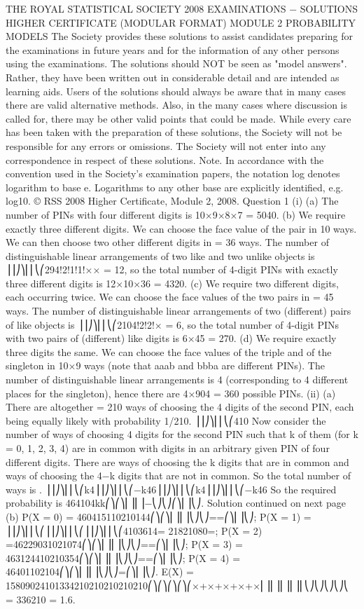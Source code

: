 THE ROYAL STATISTICAL SOCIETY
2008 EXAMINATIONS − SOLUTIONS
HIGHER CERTIFICATE
(MODULAR FORMAT)
MODULE 2
PROBABILITY MODELS
The Society provides these solutions to assist candidates preparing for the examinations in future years and for the information of any other persons using the examinations.
The solutions should NOT be seen as "model answers". Rather, they have been written out in considerable detail and are intended as learning aids.
Users of the solutions should always be aware that in many cases there are valid alternative methods. Also, in the many cases where discussion is called for, there may be other valid points that could be made.
While every care has been taken with the preparation of these solutions, the Society will not be responsible for any errors or omissions.
The Society will not enter into any correspondence in respect of these solutions.
Note. In accordance with the convention used in the Society's examination papers, the notation log denotes logarithm to base e. Logarithms to any other base are explicitly identified, e.g. log10.
© RSS 2008
Higher Certificate, Module 2, 2008. Question 1
(i) (a) The number of PINs with four different digits is 10×9×8×7 = 5040.
(b) We require exactly three different digits. We can choose the face value of the pair in 10 ways. We can then choose two other different digits in = 36 ways. The number of distinguishable linear arrangements of two like and two unlike objects is ⎟⎟⎠⎞⎜⎜⎝⎛294!2!1!1!×× = 12, so the total number of 4-digit PINs with exactly three different digits is 12×10×36 = 4320.
(c) We require two different digits, each occurring twice. We can choose the face values of the two pairs in = 45 ways. The number of distinguishable linear arrangements of two (different) pairs of like objects is ⎟⎟⎠⎞⎜⎜⎝⎛2104!2!2!× = 6, so the total number of 4-digit PINs with two pairs of (different) like digits is 6×45 = 270.
(d) We require exactly three digits the same. We can choose the face values of the triple and of the singleton in 10×9 ways (note that aaab and bbba are different PINs). The number of distinguishable linear arrangements is 4 (corresponding to 4 different places for the singleton), hence there are 4×904 = 360 possible PINs.
(ii) (a) There are altogether = 210 ways of choosing the 4 digits of the second PIN, each being equally likely with probability 1/210. ⎟⎟⎠⎞⎜⎜⎝⎛410
Now consider the number of ways of choosing 4 digits for the second PIN such that k of them (for k = 0, 1, 2, 3, 4) are in common with digits in an arbitrary given PIN of four different digits. There are ways of choosing the k digits that are in common and ways of choosing the 4−k digits that are not in common. So the total number of ways is . ⎟⎟⎠⎞⎜⎜⎝⎛k4⎟⎟⎠⎞⎜⎜⎝⎛−k46⎟⎟⎠⎞⎜⎜⎝⎛k4⎟⎟⎠⎞⎜⎜⎝⎛−k46
So the required probability is 464104kk⎛⎞⎛⎞⎜⎟⎜⎟−⎝⎠⎝⎠⎛⎞⎜⎟⎝⎠.
Solution continued on next page
(b) P(X = 0) = 460415110210144⎛⎞⎛⎞⎜⎟⎜⎟⎝⎠⎝⎠==⎛⎞⎜⎟⎝⎠;
P(X = 1) = ⎟⎟⎠⎞⎜⎜⎝⎛⎟⎟⎠⎞⎜⎜⎝⎛⎟⎟⎠⎞⎜⎜⎝⎛4103614= 21821080=;
P(X = 2) =46229031021074⎛⎞⎛⎞⎜⎟⎜⎟⎝⎠⎝⎠==⎛⎞⎜⎟⎝⎠;
P(X = 3) = 463124410210354⎛⎞⎛⎞⎜⎟⎜⎟⎝⎠⎝⎠==⎛⎞⎜⎟⎝⎠;
P(X = 4) = 46401102104⎛⎞⎛⎞⎜⎟⎜⎟⎝⎠⎝⎠=⎛⎞⎜⎟⎝⎠.
E(X) = 15809024101334210210210210210⎛⎞⎛⎞⎛⎞⎛⎞⎛×+×+×+×+×⎜⎟⎜⎟⎜⎟⎜⎟⎜⎝⎠⎝⎠⎝⎠⎝⎠⎝
= 336210 = 1.6.
